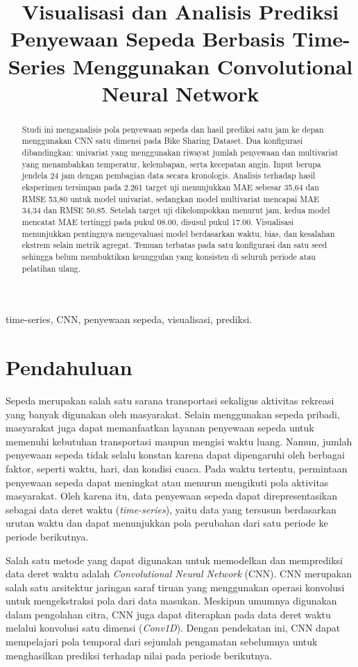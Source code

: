 \documentclass[10pt,conference]{IEEEtran}
\title{Visualisasi dan Analisis Prediksi Penyewaan Sepeda Berbasis Time-Series Menggunakan Convolutional Neural Network}
\author{\IEEEauthorblockN{Nathanael Gunawan (13524066) dan Audric Yusuf Maynard Simatupang (13524010)}
\IEEEauthorblockA{Program Studi Teknik Informatika\\Sekolah Teknik Elektro dan Informatika, Institut Teknologi Bandung}}
\begin{document}
\maketitle
\begin{abstract}
Studi ini menganalisis pola penyewaan sepeda dan hasil prediksi satu jam ke depan menggunakan CNN satu dimensi pada Bike Sharing Dataset. Dua konfigurasi dibandingkan: univariat yang menggunakan riwayat jumlah penyewaan dan multivariat yang menambahkan temperatur, kelembapan, serta kecepatan angin. Input berupa jendela 24 jam dengan pembagian data secara kronologis. Analisis terhadap hasil eksperimen tersimpan pada 2.261 target uji menunjukkan MAE sebesar 35,64 dan RMSE 53,80 untuk model univariat, sedangkan model multivariat mencapai MAE 34,34 dan RMSE 50,85. Setelah target uji dikelompokkan menurut jam, kedua model mencatat MAE tertinggi pada pukul 08.00, disusul pukul 17.00. Visualisasi menunjukkan pentingnya mengevaluasi model berdasarkan waktu, bias, dan kesalahan ekstrem selain metrik agregat. Temuan terbatas pada satu konfigurasi dan satu seed sehingga belum membuktikan keunggulan yang konsisten di seluruh periode atau pelatihan ulang.
\end{abstract}
\begin{IEEEkeywords}
time-series, CNN, penyewaan sepeda, visualisasi, prediksi.
\end{IEEEkeywords}

\section{Pendahuluan}
Sepeda merupakan salah satu sarana transportasi sekaligus aktivitas rekreasi yang banyak digunakan oleh masyarakat. Selain menggunakan sepeda pribadi, masyarakat juga dapat memanfaatkan layanan penyewaan sepeda untuk memenuhi kebutuhan transportasi maupun mengisi waktu luang. Namun, jumlah penyewaan sepeda tidak selalu konstan karena dapat dipengaruhi oleh berbagai faktor, seperti waktu, hari, dan kondisi cuaca. Pada waktu tertentu, permintaan penyewaan sepeda dapat meningkat atau menurun mengikuti pola aktivitas masyarakat. Oleh karena itu, data penyewaan sepeda dapat direpresentasikan sebagai data deret waktu (\textit{time-series}), yaitu data yang tersusun berdasarkan urutan waktu dan dapat menunjukkan pola perubahan dari satu periode ke periode berikutnya.

Salah satu metode yang dapat digunakan untuk memodelkan dan memprediksi data deret waktu adalah \textit{Convolutional Neural Network} (CNN). CNN merupakan salah satu arsitektur jaringan saraf tiruan yang menggunakan operasi konvolusi untuk mengekstraksi pola dari data masukan. Meskipun umumnya digunakan dalam pengolahan citra, CNN juga dapat diterapkan pada data deret waktu melalui konvolusi satu dimensi (\textit{Conv1D}). Dengan pendekatan ini, CNN dapat mempelajari pola temporal dari sejumlah pengamatan sebelumnya untuk menghasilkan prediksi terhadap nilai pada periode berikutnya.
\end{document}
